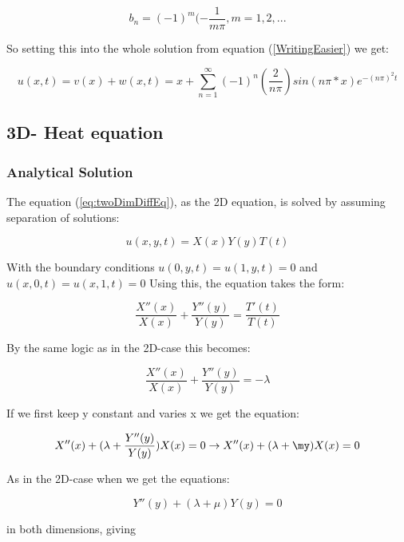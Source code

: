 \documentclass[a4paper,10pt]{article}
\begin{document}
\begin{equation}
 b_n = (-1)^m(-\frac{1}{m\pi}, m=1,2,...
\end{equation}

So setting this into the whole solution from equation (\ref{WritingEasier}) we get:

\begin{equation}
 u(x,t) = v(x) + w(x,t) = 
 x + \sum_{n=1}^{\infty}(-1)^n(\frac{2}{n\pi})sin(n\pi*x)e^{-(n\pi)^2t}
\end{equation}

\subsection{3D- Heat equation}
\subsubsection{Analytical Solution}
The equation (\ref{eq:twoDimDiffEq}), as the 2D equation, is solved by assuming separation of solutions:

\begin{equation}
 u(x,y,t) = X(x)Y(y)T(t)
\end{equation}

With the boundary conditions $u(0,y,t) = u(1,y,t) = 0$ and $u(x,0,t) = u(x,1,t) = 0$
Using this, the equation takes the form:

\begin{equation}
 \frac{X''(x)}{X(x)} + \frac{Y''(y)}{Y(y)} = \frac{T'(t)}{T(t)} 
\end{equation}

By the same logic as in the 2D-case this becomes:

\begin{equation}
 \frac{X''(x)}{X(x)} + \frac{Y''(y)}{Y(y)} = -\lambda
\end{equation}

If we first keep y constant and varies x we get the equation:

\begin{equation}
 X''(x) + (\lambda + \frac{Y''(y)}{Y(y)})X(x) = 0 \rightarrow X''(x) + (\lambda + \my)X(x) = 0
\end{equation}

As in the 2D-case when we get the equations:

\begin{equation}
 Y''(y) + (\lambda + \mu)Y(y) = 0
\end{equation}

in both dimensions, giving
\end{document}
